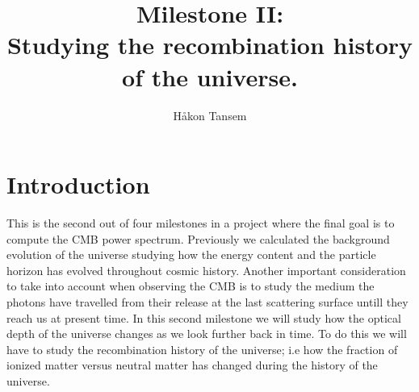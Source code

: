 \documentclass[onecolumn]{aastex62}
\begin{document}
\title{\Large Milestone II:\\Studying the recombination history of the universe.}


\author{Håkon Tansem}

\section{Introduction} \label{sec:intro}
This is the second out of four milestones in a project where the final goal is to compute the CMB power spectrum. Previously we calculated the background evolution of the universe studying how the energy content and the particle horizon has evolved throughout cosmic history. Another important consideration to take into account when observing the CMB is to study the medium the photons have travelled from their release at the last scattering surface untill they reach us at present time. In this second milestone we will study how the optical depth of the universe changes as we look further back in time. To do this we will have to study the recombination history of the universe; i.e how the fraction of ionized matter versus neutral matter has changed during the history of the universe. 
\end{document}
